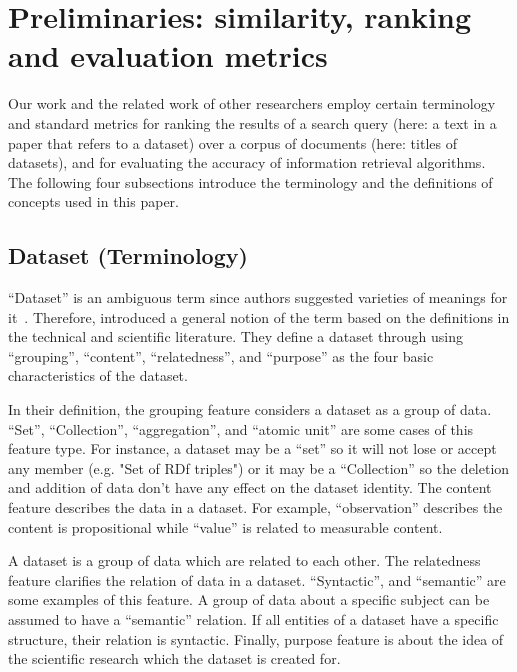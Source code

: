 \documentclass{IOS-Book-Article}
\begin{document}
\section{Preliminaries: similarity, ranking and evaluation metrics}
\label{sec:preliminaries}
Our work and the related work of other researchers employ certain terminology and standard metrics for ranking the results of a search query (here: a text in a paper that refers to a dataset) over a corpus of documents (here: titles of datasets), and for evaluating the accuracy of information retrieval algorithms.
The following four subsections introduce the terminology and the definitions of concepts used in this paper.

\subsection{Dataset (Terminology)}
\enquote{Dataset} is an ambiguous term since authors suggested varieties of meanings for it~\cite{peplerpreservation}.
Therefore, \citeauthor{renear2010definitions} introduced a general notion of the term based on the definitions in the technical and scientific literature.
They define a dataset through using \enquote{grouping}, \enquote{content}, \enquote{relatedness}, and \enquote{purpose} as the four basic characteristics of the dataset.

In their definition, the grouping feature considers a dataset as a group of data.  \enquote{Set}, \enquote{Collection}, \enquote{aggregation}, and \enquote{atomic unit} are some cases of this feature type. For instance, a dataset may be a \enquote{set} so it will not lose or accept any member (e.g. "Set of RDf triples")\cite{renear2010definitions} or it may be a \enquote{Collection} so the deletion and addition of data don't have any effect on the dataset identity. The content feature describes the data in a dataset. For example, \enquote{observation} describes the content is propositional while \enquote{value} is related to measurable content.

A dataset is a group of data which are related to each other. The relatedness feature clarifies the relation of data in a dataset. \enquote{Syntactic}, and \enquote{semantic} are some examples of this feature.   
A group of data about a specific subject can be assumed to have a \enquote{semantic} relation.
If all entities of a dataset have a specific structure, their relation is syntactic.
Finally, purpose feature is about the idea of the scientific research which the dataset is created for.
\end{document}
